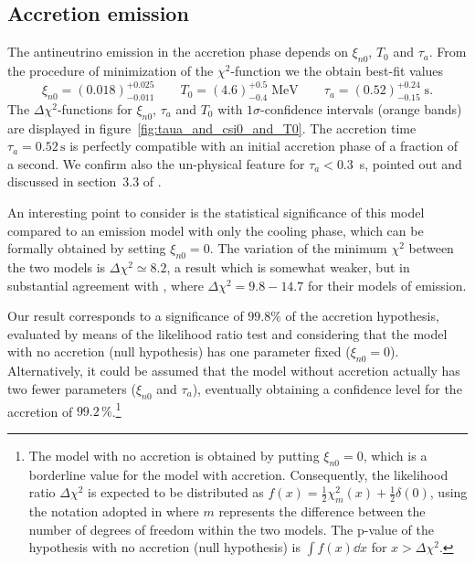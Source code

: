 \documentclass[a4paper,11pt]{article}
\begin{document}
\subsection{Accretion emission}
\label{subsec:accretion_emission}
The antineutrino emission in the  accretion phase depends on  $\xi_{n0}$, $T_0$ and $\tau_a$. From the procedure of minimization of the $\chi^2$-function we the obtain best-fit values
\begin{equation}
        \xi_{n0}=(0.018)^{+0.025}_{-0.011}  \qquad T_0=(4.6)^{+0.5}_{-0.4}\;\unit{\MeV }\qquad \tau_a=(0.52)^{+0.24}_{-0.15}\;\unit{\s }.
        \label{eq:accretion_best_fit}
\end{equation}
%
The $\Delta \chi^2$-functions for $\xi_{n0}$, $\tau_a$ and $T_0$ with $1\sigma$-confidence intervals (orange bands) are displayed in figure~\ref{fig:taua_and_csi0_and_T0}.
The accretion time $\tau_a=0.52\,\unit{\s }$ is perfectly compatible with an initial accretion phase of a fraction of a second. We confirm also the un-physical feature for $\tau_a<0.3$~s, pointed out and discussed in section~3.3 of \cite{Pagliaroli:2008ur}. 

An interesting point to consider is %
the statistical significance of this model compared to an emission model with only the cooling phase, %
which can be formally obtained 
by setting $\xi_{n0}=0$. 
The variation of the minimum $\chi^2$ between the two models is $\Delta\chi^2\simeq 8.2$, a result which is somewhat weaker, but in substantial agreement with \cite{Pagliaroli:2008ur}, where $\Delta \chi^2=9.8-14.7$ for their models of emission. 

Our result corresponds to a significance of $99.8\%$ of the accretion hypothesis, evaluated by means of the likelihood ratio test \cite{Lista:2016tva,algeri2019searching} and considering that the model with no accretion (null hypothesis)  has one parameter fixed ($\xi_{n0}=0$). 
Alternatively, it could be assumed that the model without accretion actually has two fewer parameters
 ($\xi_{n0}$ and $\tau_a$), eventually obtaining a confidence level for the accretion of $99.2\,\%$.\footnote{The model with no accretion is obtained by putting $\xi_{n0}=0$, which is a borderline value for the model with accretion.  Consequently, the likelihood ratio $\Delta \chi^2$ is expected to be distributed as $f(x)=\frac{1}{2}\chi^2_m(x)+\frac{1}{2}\delta(0)$, using the notation adopted in \cite{algeri2019searching} where $m$ represents the difference between the number of degrees of freedom within the two models. The p-value  of the hypothesis with no accretion (null hypothesis) is $\int f(x)\dd x$ for $x > \Delta \chi^2$.}
\end{document}
